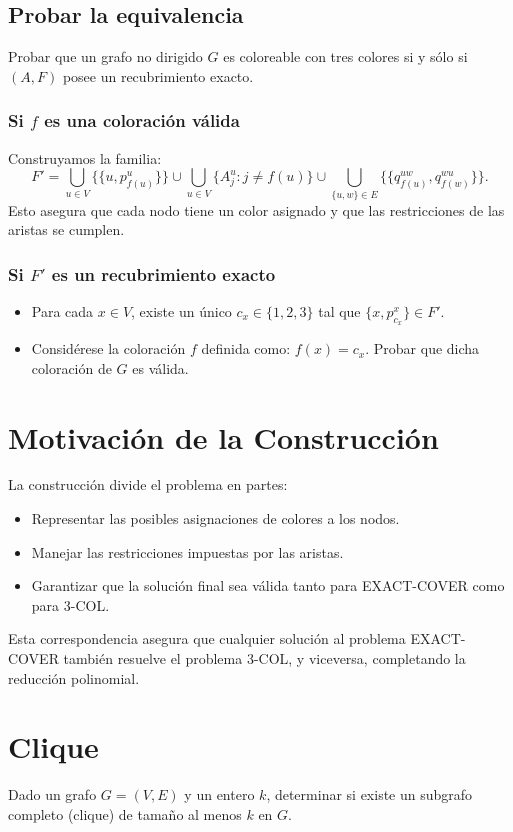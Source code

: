 \documentclass[12pt]{article}
\begin{document}
\subsection*{Probar la equivalencia}
Probar que un grafo no dirigido $G$ es coloreable con tres colores si y sólo si $(A, F)$ posee un recubrimiento exacto.

\subsubsection*{Si $f$ es una coloración válida}
Construyamos la familia:
\[
F' = \bigcup_{u \in V}\big\{\{u, p_{f(u)}^u\}\big\} \cup \bigcup_{u \in V}\big\{A_j^u : j \neq f(u)\big\} \cup \bigcup_{\{u, w\} \in E}\big\{\{q_{f(u)}^{uw}, q_{f(w)}^{wu}\}\big\}.
\]
Esto asegura que cada nodo tiene un color asignado y que las restricciones de las aristas se cumplen.

\subsubsection*{Si $F'$ es un recubrimiento exacto}
\begin{itemize}
    \item Para cada $x \in V$, existe un único $c_x \in \{1, 2, 3\}$ tal que $\{x, p_{c_x}^x\} \in F'$.
    \item Considérese la coloración $f$ definida como: $f(x) = c_x$. Probar que dicha coloración de $G$ es válida.
\end{itemize}

\section*{Motivación de la Construcción}
La construcción divide el problema en partes:
\begin{itemize}
    \item Representar las posibles asignaciones de colores a los nodos.
    \item Manejar las restricciones impuestas por las aristas.
    \item Garantizar que la solución final sea válida tanto para EXACT-COVER como para 3-COL.
\end{itemize}
Esta correspondencia asegura que cualquier solución al problema EXACT-COVER también resuelve el problema 3-COL, y viceversa, completando la reducción polinomial.

\section*{Clique}
Dado un grafo $G = (V, E)$ y un entero $k$, determinar si existe un subgrafo completo (clique) de tamaño al menos $k$ en $G$.
\end{document}
